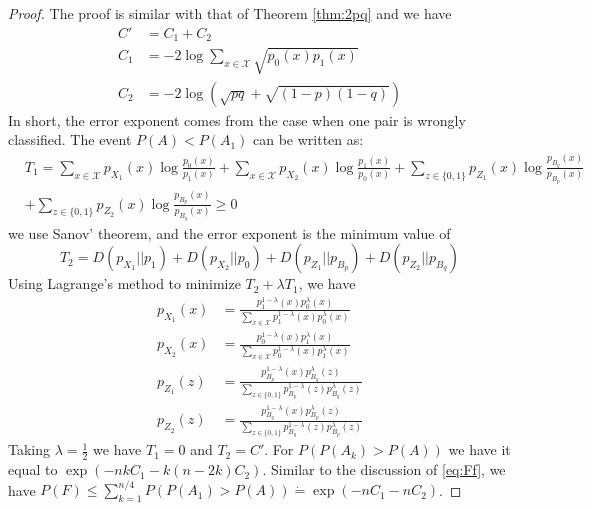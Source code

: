\documentclass{article}
\begin{document}
\begin{proof}
	The proof is similar with that of Theorem \ref{thm:2pq} and we have
	\begin{align}
	C' &= C_1 + C_2  \\
	C_1 &= - 2 \log \sum_{x\in \mathcal{X}} \sqrt{p_0(x)p_1(x)} \\
	C_2 &= -2 \log(\sqrt{pq} + \sqrt{(1-p)(1-q)}) 
	\end{align}
	In short, the error exponent comes from the case when one pair is wrongly classified.
	The event $P(A) < P(A_1)$ can be written as:
	\begin{align*}
	&T_1 = \sum_{x \in \mathcal{X}} p_{X_1}(x) \log \frac{p_0(x)}{p_1(x)}
	+ \sum_{x \in \mathcal{X}} p_{X_2}(x) \log \frac{p_1(x)}{p_0(x)}
	+ \sum_{z \in \{0,1\}} p_{Z_1}(x) \log \frac{p_{B_q}(x)}{p_{B_p}(x)}\\
	&
	+ \sum_{z \in \{0,1\}} p_{Z_2}(x) \log \frac{p_{B_p}(x)}{p_{B_q}(x)} \geq 0
	\end{align*}
	we use Sanov' theorem, and the error exponent is the minimum value of
	$$
	T_2 = D(p_{X_1} || p_1) + D(p_{X_2} || p_0) + D(p_{Z_1} || p_{B_p}) + D(p_{Z_2} || p_{B_q})
	$$
	Using Lagrange's method to minimize $T_2 + \lambda T_1$, we have
	\begin{align*}
	p_{X_1}(x) &= \frac{p_1^{1-\lambda}(x)p_0^{\lambda}(x)}{\sum_{x\in\mathcal{X}}p_1^{1-\lambda}(x)p_0^{\lambda}(x)} \\
	p_{X_2}(x) &= \frac{p_0^{1-\lambda}(x)p_1^{\lambda}(x)}{\sum_{x\in\mathcal{X}}p_0^{1-\lambda}(x)p_1^{\lambda}(x)} \\	
	p_{Z_1}(z) &= \frac{p_{B_p}^{1-\lambda}(x)p_{B_q}^{\lambda}(z)}{\sum_{z\in\{0,1\} }p_{B_p}^{1-\lambda}(z)p_{B_q}^{\lambda}(z)} \\
	p_{Z_2}(z) &= \frac{p_{B_q}^{1-\lambda}(x)p_{B_p}^{\lambda}(z)}{\sum_{z\in\{0,1\} }p_{B_q}^{1-\lambda}(z)p_{B_p}^{\lambda}(z)}	
	\end{align*}
	Taking $\lambda = \frac{1}{2}$ we have $T_1 = 0$ and $T_2 = C'$.
	For $P(P(A_k) > P(A))$ we have it equal to $\exp(-nk C_1 - k(n-2k)C_2)$.
	Similar to the discussion of \eqref{eq:Ff}, we have
	$P(F) \leq \sum_{k=1}^{n/4}P(P(A_1) > P(A)) \dot{=} \exp(-nC_1 - nC_2)$.
\end{proof}
\end{document}
